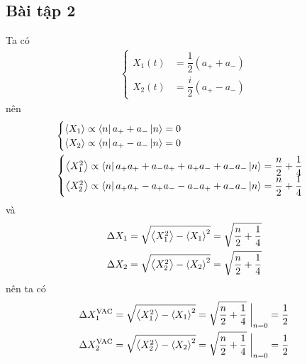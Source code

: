 \documentclass{report}
\newcommand{\f}[2]{\dfrac{#1}{#2}}
\newcommand{\at}[2]{\bigg\rvert_{#1}^{#2} }
\begin{document}
\subsection*{Bài tập 2}
Ta có
\begin{align*}
	\begin{cases}
		X_{1}(t) & = \f{1}{2} \left( a_{+} + a_{-} \right)\\
		X_{2}(t) & = \f{i}{2} \left( a_{+} - a_{-} \right)
	\end{cases}
\end{align*}
nên 
\begin{align*}
	&\begin{cases}
		\ev{X_{1}} \propto \bra{n} a_{+} + a_{-} \ket{n} = 0\\
		\ev{X_{2}} \propto \bra{n} a_{+} - a_{-} \ket{n} = 0
	\end{cases} \\
	&\begin{cases}
		\ev{X_{1}^{2}} \propto \bra{n} a_{+}a_{+} + a_{-}a_{+} + a_{+}a_{-} + a_{-}a_{-} \ket{n} = \f{n}{2} + \f{1}{4}\\
		\ev{X_{2}^{2}} \propto \bra{n} a_{+}a_{+} - a_{+}a_{-} - a_{-}a_{+} + a_{-}a_{-} \ket{n} =
		\f{n}{2} + \f{1}{4} 
	\end{cases}
\end{align*}
và
\begin{align*}
	\Delta X_{1} &= \sqrt{\ev{X_{1}^{2}} - \ev{X_{1}}^{2}} = \sqrt{\f{n}{2} + \f{1}{4}}\\	
	\Delta X_{2} &= \sqrt{\ev{X_{2}^{2}} - \ev{X_{2}}^{2}} = \sqrt{\f{n}{2} + \f{1}{4}}	
\end{align*}
nên ta có 
\begin{align*}
	\Delta X_{1}^{\text{VAC}} &= \sqrt{\ev{X_{1}^{2}} - \ev{X_{1}}^{2}} = \sqrt{\f{n}{2} + \f{1}{4}}\;\at{n = 0}{} = \f{1}{2}\\	
	\Delta X_{2}^{\text{VAC}} &= \sqrt{\ev{X_{2}^{2}} - \ev{X_{2}}^{2}} = \sqrt{\f{n}{2} + \f{1}{4}} \;\at{n = 0}{} = \f{1}{2}
\end{align*}
\end{document}
